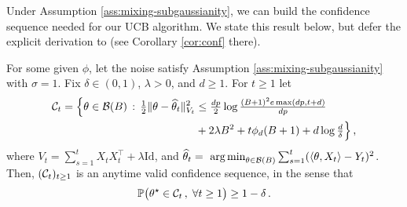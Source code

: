 Under Assumption \ref{ass:mixing-subgaussianity}, we can build the confidence sequence needed for our UCB algorithm. We 
state this result below, but defer the explicit derivation to  (see Corollary \ref{cor:conf} there). %

\begin{prop}%
 \label{prop:CS_Mixing_Bandit} For some given $\phi$, let the noise satisfy Assumption \ref{ass:mixing-subgaussianity} with $\sigma=1$. Fix $\delta\in(0,1)$, $\lambda>0$, and $d\geq 1$. For $t\geq 1$ let \begin{align*}
 \mathcal{\mathcal{C}}_t = \Big\{\theta\in\mathcal B(B)\,:\,\tfrac{1}{2}\|\theta-\widehat\theta_t\|_{V_t}^2&\leq \tfrac{dp}{2}\log\tfrac{(B+1)^2e\max(dp,t+d)}{dp} 
\\&+ 2\lambda B^2 + t\phi_d (B+1) + d\log\tfrac{d}{\delta}\Big\}\,,
 \end{align*} where $V_t = \sum_{s=1}^t X_tX_t^\top + \lambda\mathrm{Id}$, and $\widehat\theta_t = \mathop{\mbox{ arg\,min}}_{\theta\in\mathcal B(B)} \sum_{s=1}^t(\langle \theta,X_t\rangle -Y_t)^2$. Then, $(\mathcal{C}_t)_{t\geq 1}$ is an anytime valid confidence sequence, in the sense that
 $$\mathbb P\big(\theta^\star\in \mathcal{C}_t\,,\;\forall t\geq 1\big)\geq 1-\delta\,.$$
 \end{prop}
 

